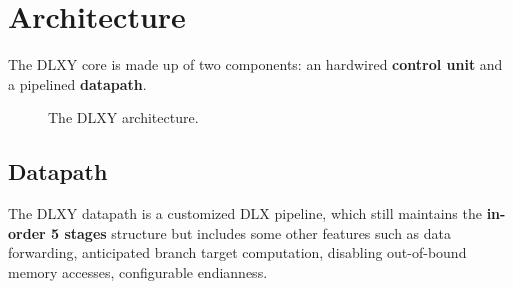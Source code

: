 \section{Architecture}
The DLXY core is made up of two components: an hardwired \textbf{control unit}
and a pipelined \textbf{datapath}.

\begin{figure}[H]
	\centering
	\caption{The DLXY architecture.}
	\label{fig:architecture}
\end{figure}

\subsection{Datapath}
The DLXY datapath is a customized DLX pipeline, which still maintains the
\textbf{in-order 5 stages} structure but includes some other features such as
data forwarding, anticipated branch target computation, disabling out-of-bound
memory accesses, configurable endianness.

